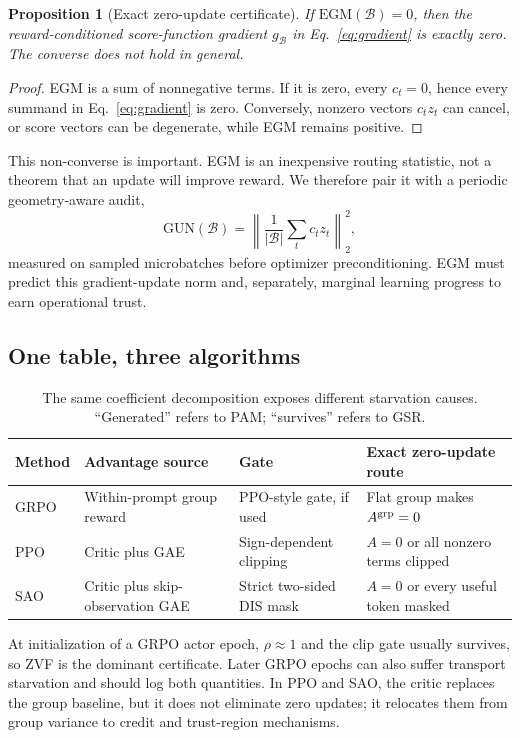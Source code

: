\documentclass{article}
\newtheorem{proposition}{Proposition}
\newcommand{\egm}{\mathrm{EGM}}
\begin{document}
\begin{proposition}[Exact zero-update certificate]
If $\egm(\mathcal{B})=0$, then the reward-conditioned score-function gradient
$g_{\mathcal{B}}$ in Eq.~\eqref{eq:gradient} is exactly zero.
The converse does not hold in general.
\end{proposition}
\begin{proof}
EGM is a sum of nonnegative terms.  If it is zero, every $c_t=0$, hence every
summand in Eq.~\eqref{eq:gradient} is zero.  Conversely, nonzero vectors
$c_tz_t$ can cancel, or score vectors can be degenerate, while EGM remains
positive.
\end{proof}

This non-converse is important.  EGM is an inexpensive routing statistic, not
a theorem that an update will improve reward.  We therefore pair it with a
periodic geometry-aware audit,
\begin{equation}
  \mathrm{GUN}(\mathcal{B})=\left\|
  \frac{1}{|\mathcal{B}|}\sum_t c_tz_t\right\|_2^2,
  \label{eq:gun}
\end{equation}
measured on sampled microbatches before optimizer preconditioning.  EGM must
predict this gradient-update norm and, separately, marginal learning progress
to earn operational trust.

\subsection{One table, three algorithms}

\begin{table}[t]
\centering
\caption{The same coefficient decomposition exposes different starvation
causes.  ``Generated'' refers to PAM; ``survives'' refers to GSR.}
\label{tab:unification}
\small
\begin{tabularx}{\linewidth}{@{}lXXX@{}}
\toprule
Method & Advantage source & Gate & Exact zero-update route \\
\midrule
GRPO & Within-prompt group reward & PPO-style gate, if used & Flat group makes $A^{\rm grp}=0$ \\
PPO & Critic plus GAE & Sign-dependent clipping & $A=0$ or all nonzero terms clipped \\
SAO & Critic plus skip-observation GAE & Strict two-sided DIS mask & $A=0$ or every useful token masked \\
\bottomrule
\end{tabularx}
\end{table}

At initialization of a GRPO actor epoch, $\rho\approx1$ and the clip gate
usually survives, so ZVF is the dominant certificate.  Later GRPO epochs can
also suffer transport starvation and should log both quantities.  In PPO and
SAO, the critic replaces the group baseline, but it does not eliminate zero
updates; it relocates them from group variance to credit and trust-region
mechanisms.
\end{document}
